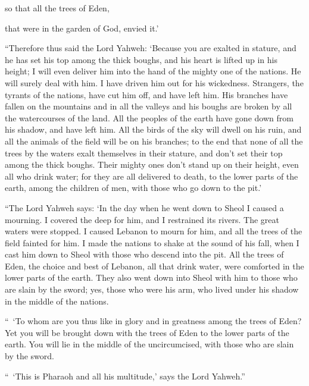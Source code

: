 {\par }{\QB so that all the trees of Eden,
\par }{\QB that were in the garden of God, envied it.’
\par }{\PP {}“Therefore thus said the Lord Yahweh: ‘Because you are exalted in stature, and he has set his top among the thick boughs, and his heart is lifted up in his height;
I will even deliver him into the hand of the mighty one of the nations. He will surely deal with him. I have driven him out for his wickedness.
Strangers, the tyrants of the nations, have cut him off, and have left him. His branches have fallen on the mountains and in all the valleys and his boughs are broken by all the watercourses of the land. All the peoples of the earth have gone down from his shadow, and have left him.
All the birds of the sky will dwell on his ruin, and all the animals of the field will be on his branches;
to the end that none of all the trees by the waters exalt themselves in their stature, and don’t set their top among the thick boughs. Their mighty ones don’t stand up on their height, even all who drink water; for they are all delivered to death, to the lower parts of the earth, among the children of men, with those who go down to the pit.’
\par }{\PP {}“The Lord Yahweh says: ‘In the day when he went down to Sheol
 I caused a mourning. I covered the deep for him, and I restrained its rivers. The great waters were stopped. I caused Lebanon to mourn for him, and all the trees of the field fainted for him.
I made the nations to shake at the sound of his fall, when I cast him down to Sheol with those who descend into the pit. All the trees of Eden, the choice and best of Lebanon, all that drink water, were comforted in the lower parts of the earth.
They also went down into Sheol with him to those who are slain by the sword; yes, those who were his arm, who lived under his shadow in the middle of the nations.
\par }{\PP {}“ ‘To whom are you thus like in glory and in greatness among the trees of Eden? Yet you will be brought down with the trees of Eden to the lower parts of the earth. You will lie in the middle of the uncircumcised, with those who are slain by the sword.
\par }{\PP “ ‘This is Pharaoh and all his multitude,’ says the Lord Yahweh.”

}
